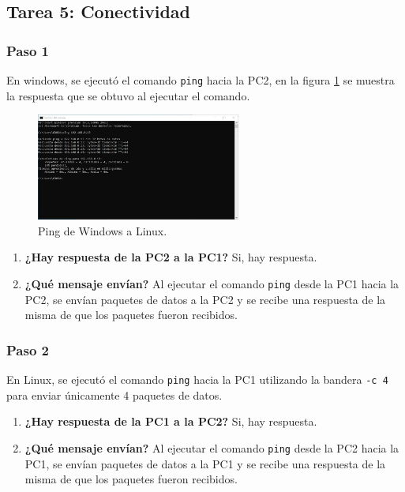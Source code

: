     \subsection{Tarea 5: Conectividad}
        \subsubsection*{Paso 1}
        
        En windows, se ejecutó el comando \texttt{ping} hacia la PC2, en la figura \ref{fig:ping_windows} se muestra la respuesta que se obtuvo al ejecutar el comando.

        \begin{figure}[H]
            \centering
            \includegraphics[width=0.6\textwidth]{img/PC1_a_PC2.jpg}
            \caption{Ping de Windows a Linux.}
            \label{fig:ping_windows}
        \end{figure}

        \begin{enumerate}
            \item \textbf{¿Hay respuesta de la PC2 a la PC1?}
            Si, hay respuesta.
            \item \textbf{¿Qué mensaje envían?}
            Al ejecutar el comando \texttt{ping} desde la PC1 hacia la PC2, se envían paquetes de datos a la PC2 y se recibe una respuesta de la misma de que los paquetes fueron recibidos.
        \end{enumerate}

        \subsubsection*{Paso 2}
        
        En Linux, se ejecutó el comando \texttt{ping} hacia la PC1 utilizando la bandera \texttt{-c 4} para enviar únicamente 4 paquetes de datos.

        \begin{enumerate}
            \item \textbf{¿Hay respuesta de la PC1 a la PC2?}
            Si, hay respuesta.
            \item \textbf{¿Qué mensaje envían?}
            Al ejecutar el comando \texttt{ping} desde la PC2 hacia la PC1, se envían paquetes de datos a la PC1 y se recibe una respuesta de la misma de que los paquetes fueron recibidos.
        \end{enumerate}

